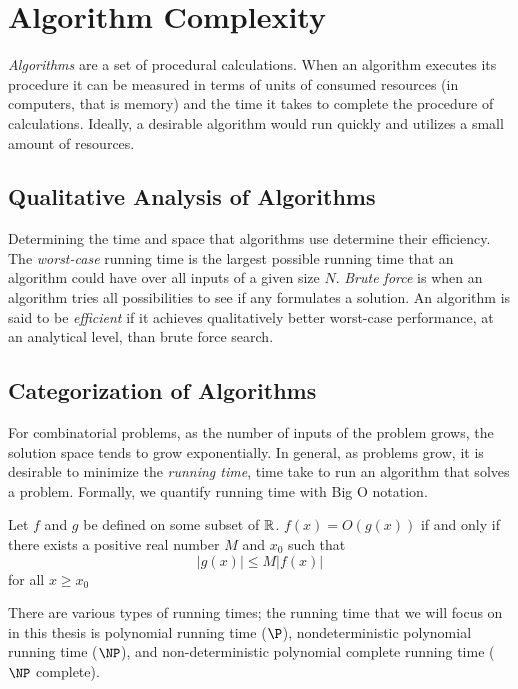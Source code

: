\section{Algorithm Complexity}
\textit{Algorithms} are a set of procedural calculations.  When an algorithm executes its procedure it can be measured in terms of units of consumed resources (in computers, that is memory) and the time it takes to complete the procedure of calculations.  Ideally, a desirable algorithm would run quickly and utilizes a small amount of resources.

\subsection{Qualitative Analysis of Algorithms  }
Determining the time and space that algorithms use determine their efficiency.  The \textit{worst-case} running time is the largest possible running time that an algorithm could have over all inputs of a given size $N$.  \textit{Brute force} is when an algorithm tries all possibilities to see if any formulates a solution.  An algorithm is said to be \textit{efficient} if it achieves qualitatively better worst-case performance, at an analytical level, than brute force search.%

\subsection{Categorization of Algorithms}
For combinatorial problems, as the number of inputs of the problem grows, the solution space tends to grow exponentially.  In general, as problems grow, it is desirable to minimize the \textit{running time}, time take to run an algorithm that solves a problem. Formally, we quantify running time with Big O notation.
\begin{definition}
Let $f$ and $g$ be defined on some subset of ${\mathbb{R}}$.  $f(x) = O\left(g(x)\right)$ if and only if there exists a positive real number $M$ and $x_0$ such that $$\left\vert g(x)\right\vert \leq M \left\vert f(x) \right\vert$$
for all $x \geq x_0$
\end{definition}
 There are various types of running times; the running time that we will focus on in this thesis is polynomial running time ($\P$), nondeterministic polynomial running time ($\NP$), and non-deterministic polynomial complete running time ($\NP$ complete).

